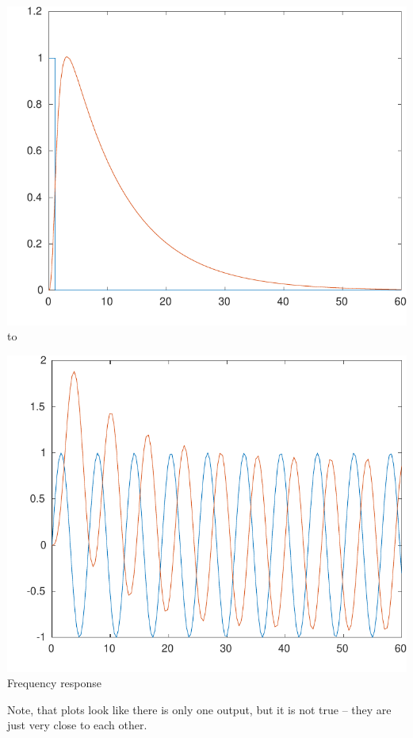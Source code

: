 \documentclass[a4paper,12pt]{article}
\begin{document}
    \includegraphics[width=\linewidth/2]{../Task1/ToReport/T1ImpulseResponse.pdf}\\
    \hbox to \linewidth {\hfil Step response \hfil Impulse response\hfil}\\
    
    \begin{center}
        \includegraphics[width=\linewidth/2]{../Task1/ToReport/T1FreqResponse.pdf}\\
        Frequency response        
    \end{center}
    Note, that plots look like there is only one output, but it is not true -- 
    they are just very close to each other.
\end{document}
